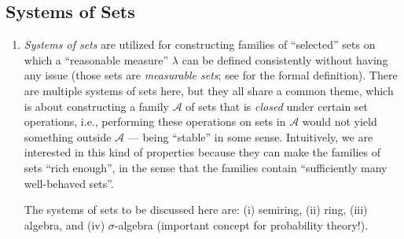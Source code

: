 \subsection{Systems of Sets}
\label{subsect:set-system}
\begin{enumerate}
\item \emph{Systems of sets} are utilized for constructing families of
``selected'' sets on which a ``reasonable measure'' \(\lambda\) can be defined
consistently without having any issue (those sets are \emph{measurable sets};
see  for the formal definition).  There are
multiple systems of sets here, but they all share a common theme, which is
about constructing a family \(\mathcal{A}\) of sets that is \emph{closed} under
certain set operations, i.e., performing these operations on sets in
\(\mathcal{A}\) would not yield something outside \(\mathcal{A}\) --- being
``stable'' in some sense.  Intuitively, we are interested in this kind of
properties because they can make the families of sets ``rich enough'', in the
sense that the families contain ``sufficiently many well-behaved sets''.

The systems of sets to be discussed here are: (i) semiring, (ii) ring, (iii)
algebra, and (iv) \ystar{} \(\sigma\)-algebra (important concept for
probability theory!).


\end{enumerate}
